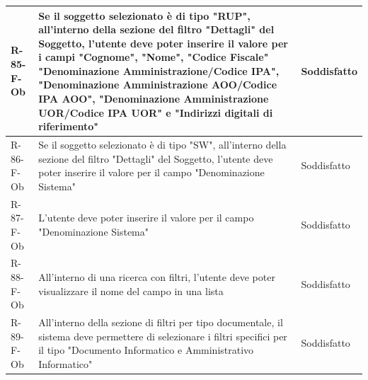 \begin{longtable}{|p{2.5cm}|p{9.5cm}|p{2.5cm}|}
\hline
R-85-F-Ob & Se il soggetto selezionato è di tipo "RUP", all'interno della sezione del filtro "Dettagli" del Soggetto, l'utente deve poter inserire il valore per i campi "Cognome", "Nome", "Codice Fiscale" "Denominazione Amministrazione/Codice IPA", "Denominazione Amministrazione AOO/Codice IPA AOO", "Denominazione Amministrazione UOR/Codice IPA UOR" e "Indirizzi digitali di riferimento" & Soddisfatto \\
\hline
R-86-F-Ob & Se il soggetto selezionato è di tipo "SW", all'interno della sezione del filtro "Dettagli" del Soggetto, l'utente deve poter inserire il valore per il campo "Denominazione Sistema" & Soddisfatto \\
\hline
R-87-F-Ob & L'utente deve poter inserire il valore per il campo "Denominazione Sistema" & Soddisfatto \\
\hline
R-88-F-Ob & All'interno di una ricerca con filtri, l'utente deve poter visualizzare il nome del campo in una lista & Soddisfatto \\
\hline
R-89-F-Ob & All'interno della sezione di filtri per tipo documentale, il sistema deve permettere di selezionare i filtri specifici per il tipo "Documento Informatico e Amministrativo Informatico" & Soddisfatto \\


\end{longtable}
